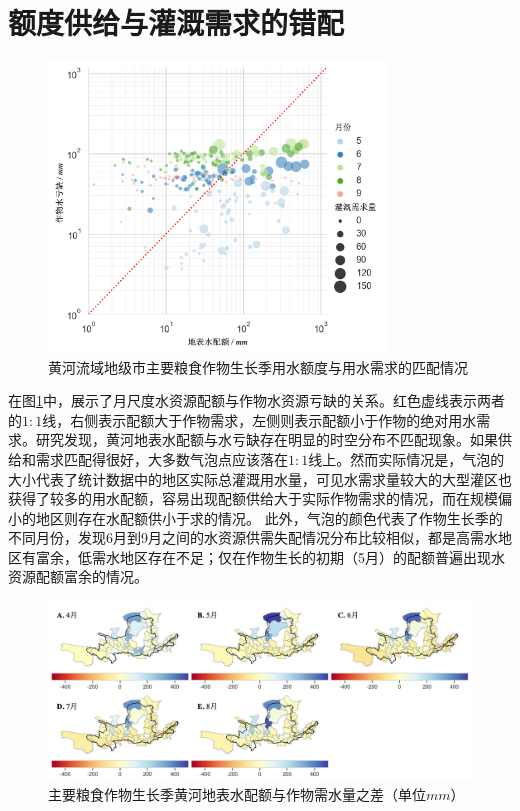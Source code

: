 
\section{额度供给与灌溉需求的错配}

\begin{figure}[htb]
    \centering
    \includegraphics[width=0.8\textwidth]{img/ch6/ch6_matches.png}
    \caption{黄河流域地级市主要粮食作物生长季用水额度与用水需求的匹配情况}\label{ch6:fig:matches}
\end{figure}

在图\ref{ch6:fig:matches}中，展示了月尺度水资源配额与作物水资源亏缺的关系。红色虚线表示两者的$1:1$线，右侧表示配额大于作物需求，左侧则表示配额小于作物的绝对用水需求。研究发现，黄河地表水配额与水亏缺存在明显的时空分布不匹配现象。如果供给和需求匹配得很好，大多数气泡点应该落在$1:1$线上。然而实际情况是，气泡的大小代表了统计数据中的地区实际总灌溉用水量，可见水需求量较大的大型灌区也获得了较多的用水配额，容易出现配额供给大于实际作物需求的情况，而在规模偏小的地区则存在水配额供小于求的情况。
此外，气泡的颜色代表了作物生长季的不同月份，发现6月到9月之间的水资源供需失配情况分布比较相似，都是高需水地区有富余，低需水地区存在不足；仅在作物生长的初期（5月）的配额普遍出现水资源配额富余的情况。

\begin{figure}[htb]
    \centering
    \includegraphics[width=\textwidth]{img/ch6/ch6_deficits_map.png}
    \caption{主要粮食作物生长季黄河地表水配额与作物需水量之差（单位$mm$）}\label{ch6:fig:deficits_maps}
\end{figure}

